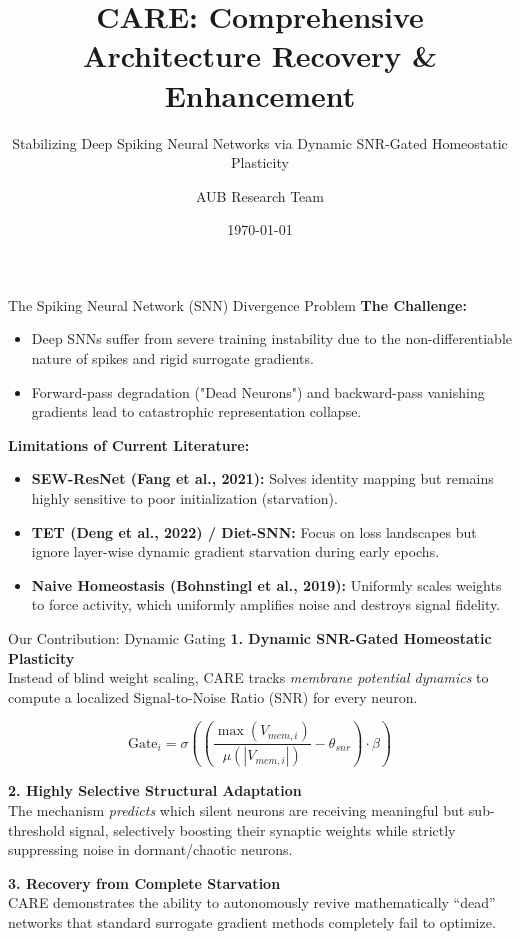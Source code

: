 \documentclass[aspectratio=169]{beamer}
\title{CARE: Comprehensive Architecture Recovery \& Enhancement}
\subtitle{Stabilizing Deep Spiking Neural Networks via Dynamic SNR-Gated Homeostatic Plasticity}
\author{AUB Research Team}
\date{\today}
\begin{document}
\begin{frame}
    \titlepage
\end{frame}

\begin{frame}{The Spiking Neural Network (SNN) Divergence Problem}
    \textbf{The Challenge:}
    \begin{itemize}
        \item Deep SNNs suffer from severe training instability due to the non-differentiable nature of spikes and rigid surrogate gradients.
        \item Forward-pass degradation ("Dead Neurons") and backward-pass vanishing gradients lead to catastrophic representation collapse.
    \end{itemize}
    
    \vspace{0.3cm}
    \textbf{Limitations of Current Literature:}
    \begin{itemize}
        \item \textbf{SEW-ResNet (Fang et al., 2021):} Solves identity mapping but remains highly sensitive to poor initialization (starvation).
        \item \textbf{TET (Deng et al., 2022) / Diet-SNN:} Focus on loss landscapes but ignore layer-wise dynamic gradient starvation during early epochs.
        \item \textbf{Naive Homeostasis (Bohnstingl et al., 2019):} Uniformly scales weights to force activity, which uniformly amplifies noise and destroys signal fidelity.
    \end{itemize}
\end{frame}

\begin{frame}{Our Contribution: Dynamic Gating}
    \textbf{1. Dynamic SNR-Gated Homeostatic Plasticity} \\
    Instead of blind weight scaling, CARE tracks \textit{membrane potential dynamics} to compute a localized Signal-to-Noise Ratio (SNR) for every neuron.
    
    \begin{equation}
        \text{Gate}_{i} = \sigma\left( \left(\frac{\max(V_{mem, i})}{\mu(|V_{mem, i}|)} - \theta_{snr}\right) \cdot \beta \right)
    \end{equation}
    
    \vspace{0.2cm}
    \textbf{2. Highly Selective Structural Adaptation} \\
    The mechanism \textit{predicts} which silent neurons are receiving meaningful but sub-threshold signal, selectively boosting their synaptic weights while strictly suppressing noise in dormant/chaotic neurons.
    
    \vspace{0.2cm}
    \textbf{3. Recovery from Complete Starvation} \\
    CARE demonstrates the ability to autonomously revive mathematically ``dead'' networks that standard surrogate gradient methods completely fail to optimize.
\end{frame}
\end{document}
